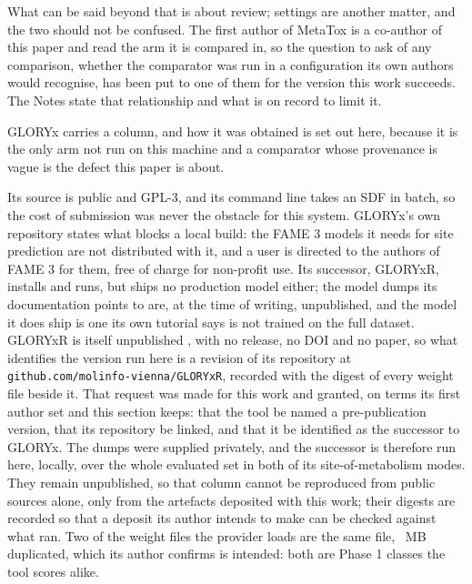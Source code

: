 \documentclass[journal=jcisd8,manuscript=suppinfo,layout=onecolumn]{achemso}
\begin{document}


What can be said beyond that is about review; settings are another matter, and the two should not
be confused. The first author of MetaTox \citep{Rudik_2017} is a co-author of this paper and read
the arm it is compared in, so the question to ask of any comparison, whether the comparator was
run in a configuration its own authors would recognise, has been put to one of them for the
version this work succeeds. The Notes state that relationship and what is on record to limit it.

GLORYx carries a column, and how it was obtained is set out here, because it is the only arm
not run on this machine and a comparator whose provenance is vague is the defect this paper is
about.

Its source is public and GPL-3, and its command line takes an SDF in batch, so the cost of
submission was never the obstacle for this system. GLORYx's own repository states what blocks a
local build: the FAME 3 models it needs for site prediction are not distributed with it, and a user
is directed to the authors of FAME 3 for them, free of charge for non-profit use. Its successor,
GLORYxR, installs and runs, but ships no production model either; the model dumps its documentation
points to are, at the time of writing, unpublished, and the model it does ship is one its own
tutorial says is not trained on the full dataset. GLORYxR is itself unpublished
\citep{Gaskin_GLORYxR}, with no release, no DOI and no paper, so what identifies the version run
here is a revision of its repository at \texttt{github.com/molinfo-vienna/GLORYxR}, recorded with
the digest of every weight file beside it. That request was made for this work and granted, on
terms its first author set and this section keeps: that the tool be named a pre-publication
version, that its repository be linked, and that it be identified as the successor to GLORYx. The
dumps were supplied privately, and the successor is therefore run here, locally, over the whole
evaluated set in both of its site-of-metabolism modes. They remain unpublished, so that column
cannot be reproduced from public sources alone, only from the artefacts deposited with this work;
their digests are recorded so that a deposit its author intends to make can be checked against what
ran. Two of the \numGloryxrDumpsWord{} weight files the provider loads are the same file,
\numGloryxrDuplicatedmb{}~MB duplicated, which its author confirms is intended: both are Phase 1
classes the tool scores alike.
\end{document}
